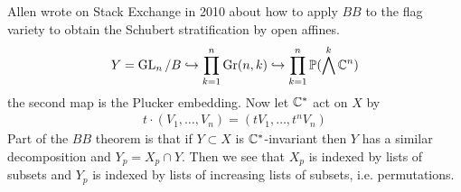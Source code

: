 \documentclass[12pt]{article}
\begin{document}
Allen wrote on Stack Exchange in 2010 about how to apply $BB$ to the flag variety to obtain the Schubert stratification by open affines.
\begin{align*}
    Y = \operatorname{GL}_n/B \hookrightarrow \prod_{k=1}^n\operatorname{Gr}(n,k)\hookrightarrow \prod_{k=1}^n \mathbb{P}(\bigwedge^k\mathbb{C}^n)
\end{align*} the second map is the Plucker embedding. Now let $\mathbb{C}^*$ act on $X$ by \begin{align*}
    t\cdot (V_1,\dots,V_n) = (tV_1,\dots,t^nV_n)
\end{align*} Part of the $BB$ theorem is that if $Y\subset X$ is $\mathbb{C}^*$-invariant then $Y$ has a similar decomposition and $Y_p = X_p\cap Y$.
Then we see that $X_p$ is indexed by lists of subsets and $Y_p$ is indexed by lists of increasing lists of subsets, i.e. permutations.


\begin{thebibliography}{9}

\end{thebibliography}
\end{document}
